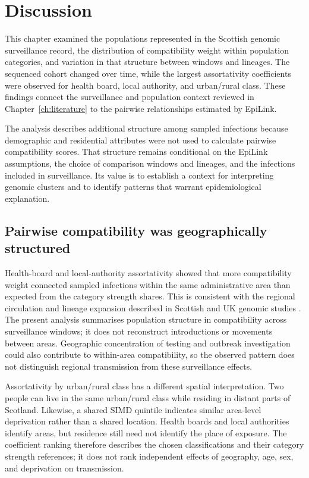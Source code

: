 \section{Discussion}\label{sec:ch4_discussion}

This chapter examined the populations represented in the Scottish genomic surveillance record, the distribution of compatibility weight within population categories, and variation in that structure between windows and lineages. The sequenced cohort changed over time, while the largest assortativity coefficients were observed for health board, local authority, and urban/rural class. These findings connect the surveillance and population context reviewed in Chapter~\ref{ch:literature} to the pairwise relationships estimated by EpiLink.

The analysis describes additional structure among sampled infections because demographic and residential attributes were not used to calculate pairwise compatibility scores. That structure remains conditional on the EpiLink assumptions, the choice of comparison windows and lineages, and the infections included in surveillance. Its value is to establish a context for interpreting genomic clusters and to identify patterns that warrant epidemiological explanation.

\subsection{Pairwise compatibility was geographically structured}\label{sec:ch4_discussion_pairwise_epidemiology}

Health-board and local-authority assortativity showed that more compatibility weight connected sampled infections within the same administrative area than expected from the category strength shares. This is consistent with the regional circulation and lineage expansion described in Scottish and UK genomic studies \citep{daSilvaFilipe2020,duPlessis2021,Vohringer2021}. The present analysis summarises population structure in compatibility across surveillance windows; it does not reconstruct introductions or movements between areas. Geographic concentration of testing and outbreak investigation could also contribute to within-area compatibility, so the observed pattern does not distinguish regional transmission from these surveillance effects.

Assortativity by urban/rural class has a different spatial interpretation. Two people can live in the same urban/rural class while residing in distant parts of Scotland. Likewise, a shared SIMD quintile indicates similar area-level deprivation rather than a shared location. Health boards and local authorities identify areas, but residence still need not identify the place of exposure. The coefficient ranking therefore describes the chosen classifications and their category strength references; it does not rank independent effects of geography, age, sex, and deprivation on transmission.

